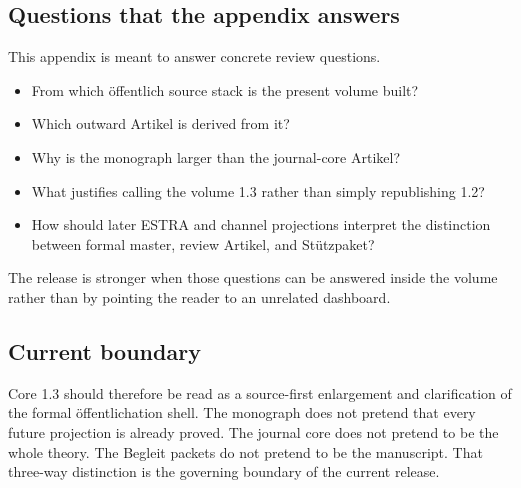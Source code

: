 \subsection{Questions that the appendix answers}

This appendix is meant to answer concrete review questions.

\begin{itemize}
\item From which öffentlich source stack is the present volume built?
\item Which outward Artikel is derived from it?
\item Why is the monograph larger than the journal-core Artikel?
\item What justifies calling the volume 1.3 rather than simply republishing 1.2?
\item How should later ESTRA and channel projections interpret the distinction between formal
      master, review Artikel, and Stützpaket?
\end{itemize}

The release is stronger when those questions can be answered inside the volume rather than by
pointing the reader to an unrelated dashboard.

\subsection{Current boundary}

Core 1.3 should therefore be read as a source-first enlargement and clarification of the formal
öffentlichation shell.
The monograph does not pretend that every future projection is already proved.
The journal core does not pretend to be the whole theory.
The Begleit packets do not pretend to be the manuscript.
That three-way distinction is the governing boundary of the current release.

\clearpage

